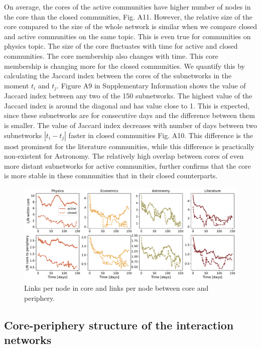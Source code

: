 On average, the cores of the active communities have higher number of nodes in the core than the closed communities, Fig. A11. However, the relative size of the core compared to the size of the whole network is similar when we compare closed and active communities on the same topic. This is even true for communities on physics topic. The size of the core fluctuates with time for active and closed communities. The core membership also changes with time. This core membership is changing more for the closed communities. We quantify this by calculating the Jaccard index between the cores of the subnetworks in the moment $t_{i}$ and $t_{j}$. Figure A9 in Supplementary Information shows the value of Jaccard index between any two of the 150 subnetworks. The highest value of the Jaccard index is around the diagonal and has value close to 1. This is expected, since these subnetworks are for consecutive days and the difference between them is smaller. The value of Jaccard index decreases with number of days between two subnetworks $|t_{i}-t_{j}|$ faster in closed communities Fig. A10. This difference is the most prominent for the literature communities, while this difference is practically non-existent for Astronomy. The relatively high overlap between cores of even more distant subnetworks for active communities, further confirms that the core is more stable in these communities that in their closed counterparts. 


\begin{figure}
	\centering
	\includegraphics[width=\linewidth]{figures/stackexchange/core_connectivity.pdf}
	\caption{Links per node in core and links per node between core and periphery.}
	\label{fig:links_per_node}
\end{figure}


\subsection{Core-periphery structure of the interaction networks}


